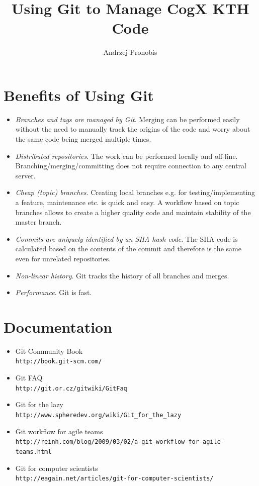 \documentclass[a4paper,10pt]{article}
\title{Using Git to Manage CogX KTH Code}
\author{Andrzej Pronobis}
\begin{document}
\maketitle


\section{Benefits of Using Git}

\begin{itemize}
\item \textit{Branches and tags are managed by Git}. Merging can be performed easily without the need to manually track the origins of the code and worry about the same code being merged multiple times.
\item \textit{Distributed repositories}. The work can be performed locally and off-line. Branching/merging/committing does not require connection to any central server.
\item \textit{Cheap (topic) branches}. Creating local branches e.g. for testing/implementing a feature, maintenance etc. is quick and easy. A workflow based on topic branches allows to create a higher quality code and maintain stability of the master branch.
\item \textit{Commits are uniquely identified by an SHA hash code}. The SHA code is calculated based on the contents of the commit and therefore is the same even for unrelated repositories.
\item \textit{Non-linear history}. Git tracks the history of all branches and merges.
\item \textit{Performance}. Git is fast.
\end{itemize}


\section{Documentation}
\begin{itemize}
  \item Git Community Book \\
       \texttt{http://book.git-scm.com/}
  \item Git FAQ \\
       \texttt{http://git.or.cz/gitwiki/GitFaq}
  \item Git for the lazy \\
       \texttt{http://www.spheredev.org/wiki/Git\_for\_the\_lazy}
  \item Git workflow for agile teams \\
       \texttt{http://reinh.com/blog/2009/03/02/a-git-workflow-for-agile-teams.html}
  \item Git for computer scientists \\
        \texttt{http://eagain.net/articles/git-for-computer-scientists/}
\end{itemize}
\end{document}
